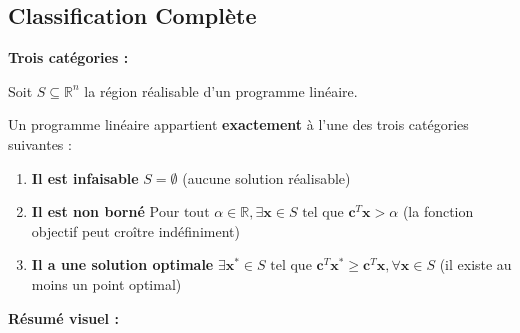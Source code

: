 \documentclass[12pt,a4paper]{article}
\begin{document}
\newpage
\subsection{Classification Complète}

\begin{definition}
\textbf{Trois catégories :}

Soit $S \subseteq \mathbb{R}^n$ la région réalisable d'un programme linéaire.

Un programme linéaire appartient \textcolor{importantrouge}{\textbf{exactement}} à l'une des trois catégories suivantes :

\begin{enumerate}
    \item \textcolor{importantrouge}{\textbf{Il est infaisable}} 
    $S = \emptyset$
    (aucune solution réalisable)
    
    \item \textcolor{algoviolet}{\textbf{Il est non borné}} 
    $\text{Pour tout } \alpha \in \mathbb{R}, \exists \mathbf{x} \in S \text{ tel que } \mathbf{c}^T\mathbf{x} > \alpha$
    (la fonction objectif peut croître indéfiniment)
    
    \item \textcolor{defvert}{\textbf{Il a une solution optimale}}
    $\exists \mathbf{x}^* \in S \text{ tel que } \mathbf{c}^T\mathbf{x}^* \geq \mathbf{c}^T\mathbf{x}, \forall \mathbf{x} \in S$
    (il existe au moins un point optimal)
\end{enumerate}
\end{definition}

\begin{astuce}
\textbf{Résumé visuel :}

\begin{center}
\end{center}
\end{astuce}
\end{document}
